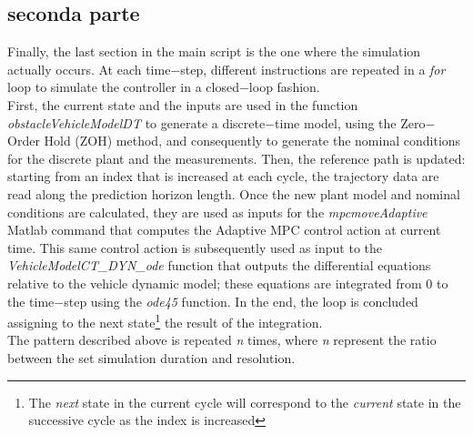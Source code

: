\subsection{seconda parte} %
Finally, the last section in the main script is the one where the simulation actually occurs. At each time$-$step, different instructions are repeated in a \textit{for} loop to simulate the controller in a closed$-$loop fashion.\\
First, the current state and the inputs are used in the function \textit{obstacleVehicleModelDT} to generate a discrete$-$time model, using the Zero$-$Order Hold (ZOH) method, and consequently to generate the nominal conditions for the discrete plant and the measurements. Then, the reference path is updated: starting from an index that is increased at each cycle, the trajectory data are read along the prediction horizon length. Once the new plant model and nominal conditions are calculated, they are used as inputs for the \textit{mpcmoveAdaptive} Matlab command that computes the Adaptive MPC control action at current time. This same control action is subsequently used as input to the \textit{VehicleModelCT\_DYN\_ode} function that outputs the differential equations relative to the vehicle dynamic model; these equations are integrated from 0 to the time$-$step using the \textit{ode45} function. In the end, the loop is concluded assigning to the next state\footnote{The \textit{next} state in the current cycle will correspond to the \textit{current} state in the successive cycle as the index is increased} the result of the integration.\\
The pattern described above is repeated \textit{n} times, where \textit{n} represent the ratio between the set simulation duration and resolution.

